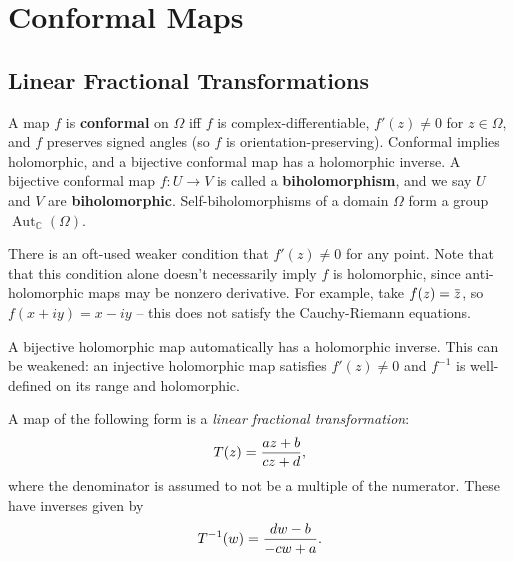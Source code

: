 \hypertarget{conformal-maps}{%
\section{Conformal Maps}\label{conformal-maps}}

\hypertarget{linear-fractional-transformations}{%
\subsection{Linear Fractional
Transformations}\label{linear-fractional-transformations}}

\begin{definition}

A map \(f\) is \textbf{conformal} on \(\Omega\) iff \(f\) is
complex-differentiable, \(f'(z)\neq 0\) for \(z\in \Omega\), and \(f\)
preserves signed angles (so \(f\) is orientation-preserving). Conformal
implies holomorphic, and a bijective conformal map has a holomorphic
inverse. A bijective conformal map \(f:U\to V\) is called a
\textbf{biholomorphism}, and we say \(U\) and \(V\) are
\textbf{biholomorphic}. Self-biholomorphisms of a domain \(\Omega\) form
a group \({\operatorname{Aut}}_{\mathbb{C}}(\Omega)\).

\end{definition}

\begin{remark}

There is an oft-used weaker condition that \(f'(z) \neq 0\) for any
point. Note that that this condition alone doesn't necessarily imply
\(f\) is holomorphic, since anti-holomorphic maps may be nonzero
derivative. For example, take
\(f(z) = \mkern 1.5mu\overline{\mkern-1.5muz\mkern-1.5mu}\mkern 1.5mu\),
so \(f(x+iy) = x-iy\) -- this does not satisfy the Cauchy-Riemann
equations.

\end{remark}

\begin{remark}

A bijective holomorphic map automatically has a holomorphic inverse.
This can be weakened: an injective holomorphic map satisfies
\(f'(z) \neq 0\) and \(f ^{-1}\) is well-defined on its range and
holomorphic.

\end{remark}

\begin{definition}

A map of the following form is a \emph{linear fractional
transformation}:
\begin{align*}  
T(z) = {az + b \over cz + d}
,\end{align*}
where the denominator is assumed to not be a multiple of the numerator.
These have inverses given by
\begin{align*}  
T^{-1}(w) = {dw-b \over -cw + a}
.\end{align*}

\end{definition}

